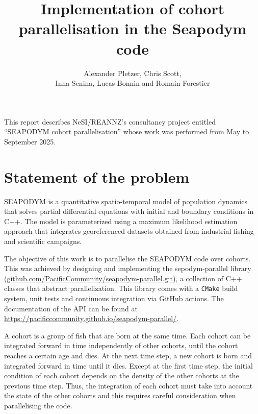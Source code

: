 \documentclass[a4paper,oneside,12pt]{article}
\begin{document}
\author{Alexander Pletzer, Chris Scott, \\
Inna Senina, Lucas Bonnin and Romain Forestier}
\title{Implementation of cohort parallelisation in the Seapodym code}

\maketitle


\pagestyle{plain}

This report describes NeSI/REANNZ's consultancy project entitled ``SEAPODYM cohort parallelisation'' whose work was performed from May to September 2025.

\section{Statement of the problem}

SEAPODYM is a quantitative spatio-temporal model
of population dynamics that solves partial differential
equations with initial and boundary conditions in C++. 
The model is parameterized using a maximum
likelihood estimation approach that integrates georeferenced 
datasets obtained from industrial fishing and scientific campaigns.

The objective of this work is to parallelise the SEAPODYM code over cohorts. 
This was achieved by designing and implementing the sepodym-parallel library 
(\url{github.com/PacificCommunity/seapodym-parallel.git}), a collection of 
C++ classes that abstract parallelization. This library comes with a 
\verb|CMake| build system, unit tests and continuous integration via 
GitHub actions. The documentation of the API can be found at 
\url{https://pacificcommunity.github.io/seapodym-parallel/}.


A cohort is a group of fish that are born at the same time. Each cohort 
can be integrated forward in time independently of other cohorts, until the cohort reaches a certain age and dies. 
At the next time step, a new cohort is born and integrated forward in time until it dies. Except 
at the first time step, the initial condition of each cohort depends on 
the density of the other cohorts at the previous time step. Thus, the integration of 
each cohort must take into account the state of the other cohorts and this requires 
careful consideration when parallelising the code.
\end{document}
